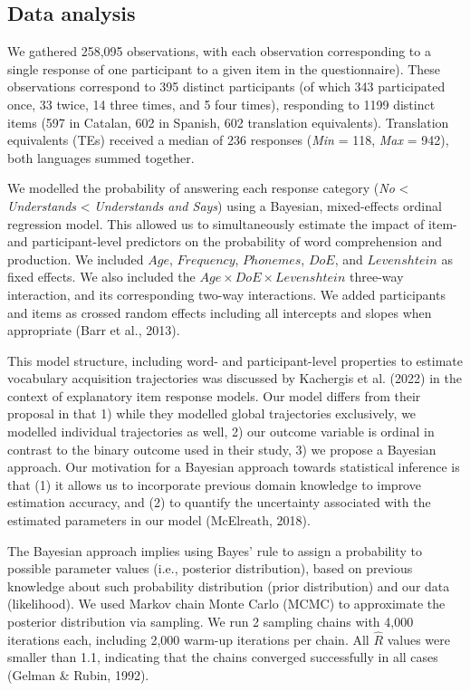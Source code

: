 \documentclass[
  letterpaper,
  DIV=11,
  numbers=noendperiod]{scrartcl}
\begin{document}
\hypertarget{analysis}{%
\subsection{Data analysis}\label{analysis}}

We gathered 258,095 observations, with each observation corresponding to
a single response of one participant to a given item in the
questionnaire). These observations correspond to 395 distinct
participants (of which 343 participated once, 33 twice, 14 three times,
and 5 four times), responding to 1199 distinct items (597 in Catalan,
602 in Spanish, 602 translation equivalents). Translation equivalents
(TEs) received a median of 236 responses (\emph{Min} = 118, \emph{Max} =
942), both languages summed together.

We modelled the probability of answering each response category
(\emph{No} \textless{} \emph{Understands} \textless{} \emph{Understands
and Says}) using a Bayesian, mixed-effects ordinal regression model.
This allowed us to simultaneously estimate the impact of item- and
participant-level predictors on the probability of word comprehension
and production. We included \(Age\), \(Frequency\), \(Phonemes\),
\(DoE\), and \(Levenshtein\) as fixed effects. We also included the
\(Age \times DoE \times Levenshtein\) three-way interaction, and its
corresponding two-way interactions. We added participants and items as
crossed random effects including all intercepts and slopes when
appropriate (Barr et al., 2013).

This model structure, including word- and participant-level properties
to estimate vocabulary acquisition trajectories was discussed by
Kachergis et al. (2022) in the context of explanatory item response
models. Our model differs from their proposal in that 1) while they
modelled global trajectories exclusively, we modelled individual
trajectories as well, 2) our outcome variable is ordinal in contrast to
the binary outcome used in their study, 3) we propose a Bayesian
approach. Our motivation for a Bayesian approach towards statistical
inference is that (1) it allows us to incorporate previous domain
knowledge to improve estimation accuracy, and (2) to quantify the
uncertainty associated with the estimated parameters in our model
(McElreath, 2018).

The Bayesian approach implies using Bayes' rule to assign a probability
to possible parameter values (i.e., posterior distribution), based on
previous knowledge about such probability distribution (prior
distribution) and our data (likelihood). We used Markov chain Monte
Carlo (MCMC) to approximate the posterior distribution via sampling. We
run 2 sampling chains with 4,000 iterations each, including 2,000
warm-up iterations per chain. All \(\hat{R}\) values were smaller than
1.1, indicating that the chains converged successfully in all cases
(Gelman \& Rubin, 1992).
\end{document}
